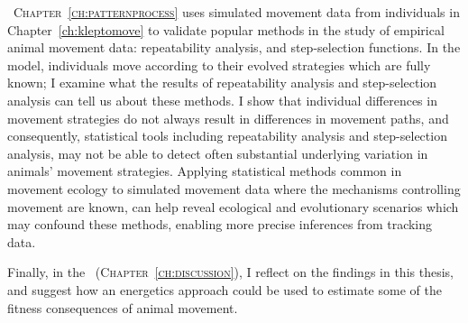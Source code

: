 {\scshape~Chapter~\ref{ch:patternprocess}} uses simulated movement data from individuals in Chapter~\ref{ch:kleptomove} to validate popular methods in the study of empirical animal movement data: repeatability analysis, and step-selection functions.
In the model, individuals move according to their evolved strategies which are fully known; I examine what the results of repeatability analysis and step-selection analysis can tell us about these methods.
I show that individual differences in movement strategies do not always result in differences in movement paths, and consequently, statistical tools including repeatability analysis and step-selection analysis, may not be able to detect often substantial underlying variation in animals' movement strategies.
Applying statistical methods common in movement ecology to simulated movement data where the mechanisms controlling movement are known, can help reveal ecological and evolutionary scenarios which may confound these methods, enabling more precise inferences from tracking data.

\medskip

Finally, in the {\scshape~(Chapter~\ref{ch:discussion})}, I reflect on the findings in this thesis, and suggest how an energetics approach could be used to estimate some of the fitness consequences of animal movement.


\endgroup

{ \begin{center}  \end{center} }

\vfill

\cleardoublepage

